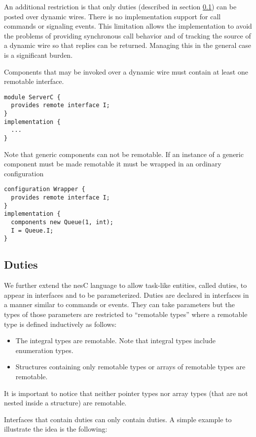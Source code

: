 An additional restriction is that only duties (described in section \ref{sec:duties}) can be
posted over dynamic wires. There is no implementation support for call commands or signaling
events. This limitation allows the implementation to avoid the problems of providing synchronous
call behavior and of tracking the source of a dynamic wire so that replies can be returned.
Managing this in the general case is a significant burden.

Components that may be invoked over a dynamic wire must contain at least one remotable
interface.

\begin{verbatim}
module ServerC {
  provides remote interface I;
}
implementation {
  ...
}
\end{verbatim}

Note that generic components can not be remotable. If an instance of a generic component must be
made remotable it must be wrapped in an ordinary configuration

\begin{verbatim}
configuration Wrapper {
  provides remote interface I;
}
implementation {
  components new Queue(1, int);
  I = Queue.I;
}
\end{verbatim}

\subsection{Duties}
\label{sec:duties}

We further extend the nesC language to allow task-like entities, called duties, to appear in
interfaces and to be parameterized. Duties are declared in interfaces in a manner similar to
commands or events. They can take parameters but the types of those parameters are restricted to
``remotable types'' where a remotable type is defined inductively as follows:

\begin{itemize}
\item The integral types are remotable. Note that integral types include enumeration types.
\item Structures containing only remotable types or arrays of remotable types are remotable.
\end{itemize}

It is important to notice that neither pointer types nor array types (that are not nested inside
a structure) are remotable.

Interfaces that contain duties can only contain duties. A simple example to illustrate the idea
is the following:

